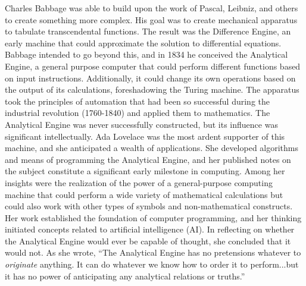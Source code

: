 Charles Babbage was able to build upon the work of Pascal, Leibniz, and others to create something more complex. His goal was to create mechanical apparatus to tabulate transcendental functions. The result was the Difference Engine, an early machine that could approximate the solution to differential equations. Babbage intended to go beyond this, and in 1834 he conceived the Analytical Engine, a general purpose computer that could perform different functions based on input instructions. Additionally, it could change its own operations based on the output of its calculations, foreshadowing the Turing machine. The apparatus took the principles of automation that had been so successful during the industrial revolution (1760-1840) and applied them to mathematics. The Analytical Engine was never successfully constructed, but its influence was significant intellectually. Ada Lovelace was the most ardent supporter of this machine, and she anticipated a wealth of applications. She developed algorithms and means of programming the Analytical Engine, and her published notes on the subject constitute a significant early milestone in computing. Among her insights were the realization of the power of a general-purpose computing machine that could perform a wide variety of mathematical calculations but could also work with other types of symbols and non-mathematical constructs. Her work established the foundation of computer programming, and her thinking initiated concepts related to artificial intelligence (AI). In reflecting on whether the Analytical Engine would ever be capable of thought, she concluded that it would not. As she wrote, ``The Analytical Engine has no pretensions whatever to \textit{originate} anything. It can do whatever we know how to order it to perform...but it has no power of anticipating any analytical relations or truths.'' \cite{is2014}   


